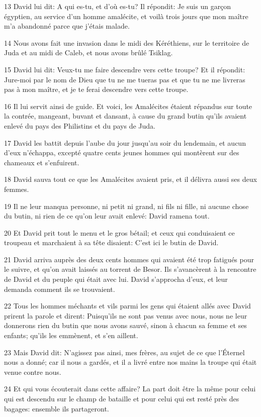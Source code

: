 \par 13 David lui dit: A qui es-tu, et d'où es-tu? Il répondit: Je suis un garçon égyptien, au service d'un homme amalécite, et voilà trois jours que mon maître m'a abandonné parce que j'étais malade.
\par 14 Nous avons fait une invasion dans le midi des Kéréthiens, sur le territoire de Juda et au midi de Caleb, et nous avons brûlé Tsiklag.
\par 15 David lui dit: Veux-tu me faire descendre vers cette troupe? Et il répondit: Jure-moi par le nom de Dieu que tu ne me tueras pas et que tu ne me livreras pas à mon maître, et je te ferai descendre vers cette troupe.
\par 16 Il lui servit ainsi de guide. Et voici, les Amalécites étaient répandus sur toute la contrée, mangeant, buvant et dansant, à cause du grand butin qu'ils avaient enlevé du pays des Philistins et du pays de Juda.
\par 17 David les battit depuis l'aube du jour jusqu'au soir du lendemain, et aucun d'eux n'échappa, excepté quatre cents jeunes hommes qui montèrent sur des chameaux et s'enfuirent.
\par 18 David sauva tout ce que les Amalécites avaient pris, et il délivra aussi ses deux femmes.
\par 19 Il ne leur manqua personne, ni petit ni grand, ni fils ni fille, ni aucune chose du butin, ni rien de ce qu'on leur avait enlevé: David ramena tout.
\par 20 Et David prit tout le menu et le gros bétail; et ceux qui conduisaient ce troupeau et marchaient à sa tête disaient: C'est ici le butin de David.
\par 21 David arriva auprès des deux cents hommes qui avaient été trop fatigués pour le suivre, et qu'on avait laissés au torrent de Besor. Ils s'avancèrent à la rencontre de David et du peuple qui était avec lui. David s'approcha d'eux, et leur demanda comment ils se trouvaient.
\par 22 Tous les hommes méchants et vils parmi les gens qui étaient allés avec David prirent la parole et dirent: Puisqu'ils ne sont pas venus avec nous, nous ne leur donnerons rien du butin que nous avons sauvé, sinon à chacun sa femme et ses enfants; qu'ils les emmènent, et s'en aillent.
\par 23 Mais David dit: N'agissez pas ainsi, mes frères, au sujet de ce que l'Éternel nous a donné; car il nous a gardés, et il a livré entre nos mains la troupe qui était venue contre nous.
\par 24 Et qui vous écouterait dans cette affaire? La part doit être la même pour celui qui est descendu sur le champ de bataille et pour celui qui est resté près des bagages: ensemble ils partageront.
